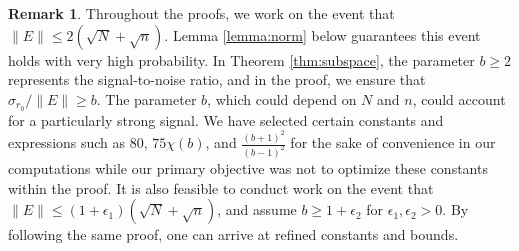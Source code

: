 \documentclass[reqno]{amsart}
\theoremstyle{plain}
\theoremstyle{definition}
\newtheorem{remark}[theorem]{Remark}
\begin{document}
\begin{remark}Throughout the proofs, we work on the event that $\|E\| \le 2(\sqrt N+ \sqrt{n}).$ Lemma \ref{lemma:norm} below guarantees this event holds with very high probability.   In Theorem \ref{thm:subspace}, the parameter $b\ge 2$ represents the signal-to-noise ratio, and in the proof, we ensure that $\sigma_{r_0}/\|E\| \ge b$. The parameter $b$, which could depend on $N$ and $n$, could account for a particularly strong signal. We have selected certain constants and expressions such as 80, $75\chi(b)$, and $ \frac{(b+1)^2}{(b-1)^2}$ for the sake of convenience in our computations while our primary objective was not to optimize these constants within the proof. It is also feasible to conduct work on the event that $\|E\| \le (1+\epsilon_1)(\sqrt N+ \sqrt{n})$, and assume $b \ge 1+\epsilon_2$ for $\epsilon_1, \epsilon_2>0$. By following the same proof, one can arrive at refined constants and bounds.
\end{remark}
\end{document}

